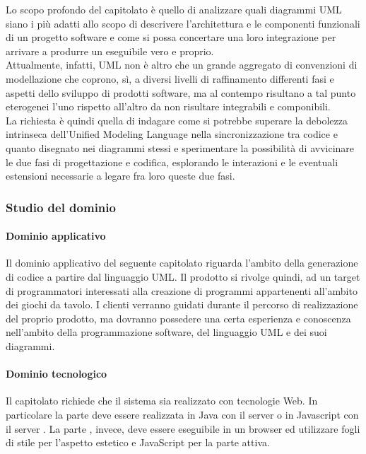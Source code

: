 		
		Lo scopo profondo del capitolato è quello di analizzare quali diagrammi UML siano i più adatti allo scopo di descrivere l'architettura 
		e le componenti funzionali di un progetto software e come si possa concertare una loro integrazione per arrivare a produrre un eseguibile vero e proprio. 
		\\Attualmente, infatti, UML non è altro che un grande aggregato di convenzioni di modellazione che coprono, sì, a diversi livelli di raffinamento differenti 
		fasi e aspetti dello sviluppo di prodotti software, ma al contempo risultano a tal punto eterogenei l'uno rispetto all'altro da non risultare integrabili e componibili. 
		\\La richiesta è quindi quella di indagare come si potrebbe superare la debolezza intrinseca dell'Unified Modeling Language nella sincronizzazione tra 
		codice e quanto disegnato nei diagrammi stessi e sperimentare la possibilità di avvicinare le due fasi di progettazione e codifica, esplorando le 
		interazioni e le eventuali estensioni necessarie a legare fra loro queste due fasi.
		\subsubsection{Studio del dominio}
			\paragraph{Dominio applicativo} Il dominio applicativo del seguente capitolato riguarda l'ambito della generazione di codice a partire dal linguaggio UML. Il prodotto si rivolge quindi, ad un target di programmatori interessati alla creazione di programmi appartenenti all'ambito dei giochi da tavolo. I clienti verranno guidati durante il percorso di realizzazione del proprio prodotto, ma dovranno possedere una certa esperienza e conoscenza nell'ambito della programmazione software, del linguaggio UML e dei suoi diagrammi.
			
			\paragraph{Dominio tecnologico}
			Il capitolato richiede che il sistema sia realizzato con tecnologie Web. In particolare la parte  deve essere realizzata in Java con il server 
			 o in Javascript con il server . La parte , invece, deve essere eseguibile in un browser  ed utilizzare fogli di stile  per 
			l'aspetto estetico e JavaScript per la parte attiva.
		
